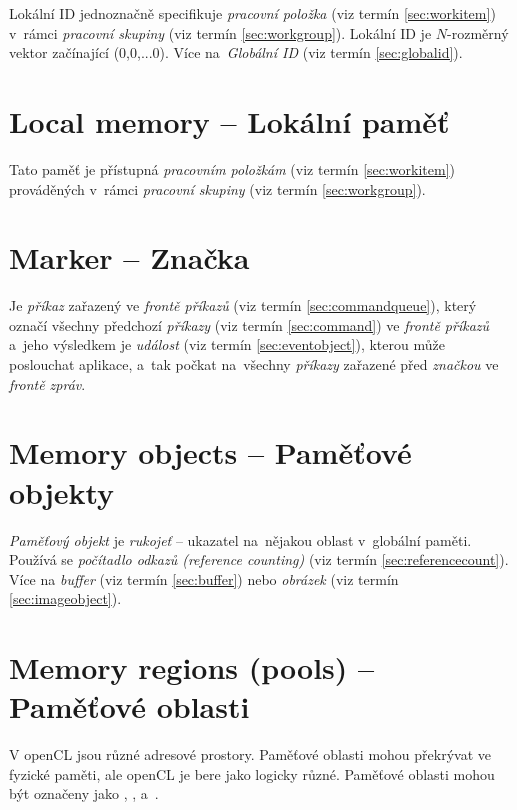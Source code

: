 Lokální ID jednoznačně specifikuje \emph{pracovní položka} (viz termín \ref{sec:workitem}) v~rámci \emph{pracovní skupiny} (viz termín \ref{sec:workgroup}). 
Lokální ID je $N$-rozměrný vektor začínající (0,0,...0). Více na~\emph{Globální  ID} (viz termín \ref{sec:globalid}).

\section{Local memory -- Lokální paměť}
\label{sec:localmemory}


Tato paměť je přístupná \emph{pracovním položkám} (viz termín \ref{sec:workitem}) prováděných v~rámci \emph{pracovní skupiny} (viz termín \ref{sec:workgroup}).

\section{Marker -- Značka}
\label{sec:marker}

Je \emph{příkaz} zařazený ve \emph{frontě příkazů} (viz termín \ref{sec:commandqueue}), který označí všechny předchozí \emph{příkazy} (viz termín \ref{sec:command})
ve \emph{frontě příkazů} a~jeho výsledkem je \emph{událost} (viz termín \ref{sec:eventobject}), kterou může poslouchat aplikace, 
a~tak počkat na~všechny \emph{příkazy} zařazené před
\emph{značkou} ve \emph{frontě zpráv}.

\section{Memory objects -- Paměťové objekty}
\label{sec:memoryobjects}

\emph{Paměťový objekt} je \emph{rukojeť} -- ukazatel na~nějakou oblast v~globální paměti. Používá se \emph{počítadlo odkazů (reference counting)} (viz termín \ref{sec:referencecount}). Více na
\emph{buffer} (viz termín \ref{sec:buffer}) nebo \emph{obrázek} (viz termín \ref{sec:imageobject}).

\section{Memory regions (pools) -- 
Paměťové oblasti}
\label{sec:pools}

V openCL jsou různé adresové prostory. Paměťové oblasti mohou překrývat ve fyzické paměti, ale
openCL je bere jako logicky různé. Paměťové oblasti
mohou být označeny jako , , 
a~.

